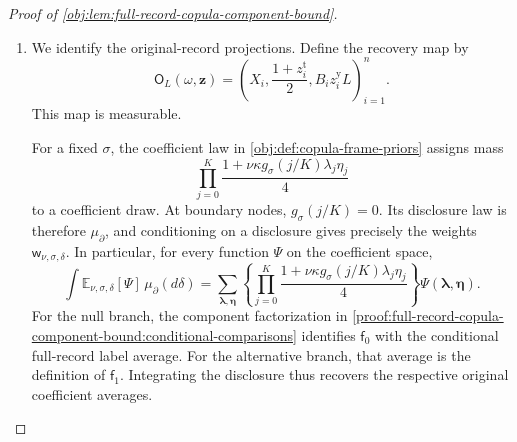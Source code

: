 \documentclass[11pt]{article}
\begin{document}
\begin{proof}[Proof of \cref{obj:lem:full-record-copula-component-bound}]
\begin{enumerate}
For \(d_{\mathrm{ser}}\in\{6,11\}\), the elementary inequality
\(r_{\mathrm{occ}}\le2^{r_{\mathrm{occ}}-1}\) gives
\[
\begin{aligned}
\sum_{r_{\mathrm{occ}}=2}^{\infty}
 r_{\mathrm{occ}}^{d_{\mathrm{ser}}}
 \zeta_{\mathrm{occ}}^{r_{\mathrm{occ}}}
 &\le
 2^{d_{\mathrm{ser}}}\zeta_{\mathrm{occ}}^2
 \sum_{r_{\mathrm{occ}}=2}^{\infty}
 (2^{d_{\mathrm{ser}}}\zeta_{\mathrm{occ}})^{r_{\mathrm{occ}}-2}\\
 &=
 \frac{2^{d_{\mathrm{ser}}}\zeta_{\mathrm{occ}}^2}
      {1-2^{d_{\mathrm{ser}}}\zeta_{\mathrm{occ}}}
 \le2^{d_{\mathrm{ser}}+1}\zeta_{\mathrm{occ}}^2.
\end{aligned}
\]
The geometric series converges because
\[
0\le\zeta_{\mathrm{occ}}\le24\,\frac nK,
\qquad
2^{11}\zeta_{\mathrm{occ}}
 \le2^{11}\cdot24\cdot2^{-40}<\frac12.
\]
Here we used \(e<3\) and \(2^{40}n\le K\). Consequently,
\[
\begin{aligned}
\int\mathcal A\,d\mu
 &\le
 2^{26}24^2\,
 \frac{a^4u^4\varepsilon^2n^2}{K}
 \le
 \frac{2^{38}a^4u^4\varepsilon^2n^2}{K},\\
\int\mathcal B\,d\mu
 &\le
 2^{31}24^4\,
 \frac{a^4u^4\varepsilon^2n^4}{MK^2}
 \le
 \frac{2^{56}a^4u^4\varepsilon^2n^4}{MK^2},
\end{aligned}
\]
since \(2^{26}24^2<2^{38}\) and \(2^{31}24^4<2^{56}\).
The budgets are measurable finite sums. The uniform component denominator bounds and finite label alphabet make them bounded for fixed parameters, hence integrable under the probability law \(\mu\).

\item\label{proof:full-record-copula-component-bound:record-projections}
We identify the original-record projections. Define the recovery map by
\[
\mathsf O_L(\omega,\mathbf z)
 =
 \left(
 X_i,\frac{1+z_i^{\mathrm t}}2,B_i z_i^{\mathrm y}L
 \right)_{i=1}^{n}.
\]
This map is measurable.

For a fixed \(\sigma\), the coefficient law in
\cref{obj:def:copula-frame-priors} assigns mass
\[
\prod_{j=0}^{K}
 \frac{1+\nu\kappa g_\sigma(j/K)\lambda_j\eta_j}{4}
\]
to a coefficient draw. At boundary nodes, \(g_\sigma(j/K)=0\). Its disclosure law is therefore \(\mu_{\partial}\), and conditioning on a disclosure gives precisely the weights
\(\mathsf w_{\nu,\sigma,\delta}\). In particular, for every function \(\Psi\) on the coefficient space,
\[
\int
 \mathbb E_{\nu,\sigma,\delta}[\Psi]\,
 \mu_{\partial}(d\delta)
 =
 \sum_{\boldsymbol\lambda,\boldsymbol\eta}
 \left\{
 \prod_{j=0}^{K}
 \frac{1+\nu\kappa g_\sigma(j/K)\lambda_j\eta_j}{4}
 \right\}
 \Psi(\boldsymbol\lambda,\boldsymbol\eta).
\]
For the null branch, the component factorization in \cref{proof:full-record-copula-component-bound:conditional-comparisons} identifies
\(\mathsf f_0\) with the conditional full-record label average. For the alternative branch, that average is the definition of \(\mathsf f_1\). Integrating the disclosure thus recovers the respective original coefficient averages.


\end{enumerate}
\end{proof}
\end{document}
